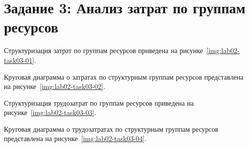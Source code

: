\section{Задание 3: Анализ затрат по группам ресурсов}

Структуризация затрат по группам ресурсов приведена на
рисунке~\ref{img:lab02-task03-01}.


Круговая диаграмма о затратах по структурным группам ресурсов представлена на
рисунке~\ref{img:lab02-task03-02}.


Структуризация трудозатрат по группам ресурсов приведена на
рисунке~\ref{img:lab02-task03-03}.


Круговая диаграмма о трудозатратах по структурным группам ресурсов представлена на
рисунке~\ref{img:lab02-task03-04}.

